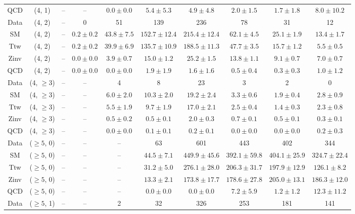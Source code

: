 \begin{table}[h!]
{\begin{tabular}{cccccccccc}
	QCD & (4, 1) & -- & -- & $0.0\pm 0.0$ & $5.4\pm 5.3$ & $4.9\pm 4.8$ & $2.0\pm 1.5$ & $1.7\pm 1.8$ & $8.0\pm 10.2$ \\[0.5ex] 
	Data & (4, 2) & -- & 0 & 51 & 139 & 236 & 78 & 31 & 12 \\[0.5ex] 
	SM & (4, 2) & -- & $0.2\pm 0.2$ & $43.8\pm 7.5$ & $152.7\pm 12.4$ & $215.4\pm 12.4$ & $62.1\pm 4.5$ & $25.1\pm 1.9$ & $13.4\pm 1.7$ \\[0.5ex] 
	Ttw & (4, 2) & -- & $0.2\pm 0.2$ & $39.9\pm 6.9$ & $135.7\pm 10.9$ & $188.5\pm 11.3$ & $47.7\pm 3.5$ & $15.7\pm 1.2$ & $5.5\pm 0.5$ \\[0.5ex] 
	Zinv & (4, 2) & -- & $0.0\pm 0.0$ & $3.9\pm 0.7$ & $15.0\pm 1.2$ & $25.2\pm 1.5$ & $13.8\pm 1.1$ & $9.1\pm 0.7$ & $7.0\pm 0.7$ \\[0.5ex] 
	QCD & (4, 2) & -- & $0.0\pm 0.0$ & $0.0\pm 0.0$ & $1.9\pm 1.9$ & $1.6\pm 1.6$ & $0.5\pm 0.4$ & $0.3\pm 0.3$ & $1.0\pm 1.2$ \\[0.5ex] 
	Data & (4, $\ge3$) & -- & -- & 4 & 8 & 23 & 3 & 2 & 0 \\[0.5ex] 
	SM & (4, $\ge3$) & -- & -- & $6.0\pm 2.0$ & $10.3\pm 2.0$ & $19.2\pm 2.4$ & $3.3\pm 0.6$ & $1.9\pm 0.4$ & $2.8\pm 0.9$ \\[0.5ex] 
	Ttw & (4, $\ge3$) & -- & -- & $5.5\pm 1.9$ & $9.7\pm 1.9$ & $17.0\pm 2.1$ & $2.5\pm 0.4$ & $1.4\pm 0.3$ & $2.3\pm 0.8$ \\[0.5ex] 
	Zinv & (4, $\ge3$) & -- & -- & $0.5\pm 0.2$ & $0.5\pm 0.1$ & $2.0\pm 0.3$ & $0.7\pm 0.1$ & $0.5\pm 0.1$ & $0.3\pm 0.1$ \\[0.5ex] 
	QCD & (4, $\ge3$) & -- & -- & $0.0\pm 0.0$ & $0.1\pm 0.1$ & $0.2\pm 0.1$ & $0.0\pm 0.0$ & $0.0\pm 0.0$ & $0.2\pm 0.3$ \\[0.5ex] 
	Data & ($\ge5$, 0) & -- & -- & -- & 63 & 601 & 443 & 402 & 344 \\[0.5ex] 
	SM & ($\ge5$, 0) & -- & -- & -- & $44.5\pm 7.1$ & $449.9\pm 45.6$ & $392.1\pm 59.8$ & $404.1\pm 25.9$ & $324.7\pm 22.4$ \\[0.5ex] 
	Ttw & ($\ge5$, 0) & -- & -- & -- & $31.2\pm 5.0$ & $276.1\pm 28.0$ & $206.3\pm 31.7$ & $197.9\pm 12.9$ & $126.1\pm 8.2$ \\[0.5ex] 
	Zinv & ($\ge5$, 0) & -- & -- & -- & $13.3\pm 2.1$ & $173.8\pm 17.7$ & $178.6\pm 27.8$ & $205.0\pm 13.1$ & $186.3\pm 12.0$ \\[0.5ex] 
	QCD & ($\ge5$, 0) & -- & -- & -- & $0.0\pm 0.0$ & $0.0\pm 0.0$ & $7.2\pm 5.9$ & $1.2\pm 1.2$ & $12.3\pm 11.2$ \\[0.5ex] 
	Data & ($\ge5$, 1) & -- & -- & 2 & 32 & 326 & 253 & 181 & 141 \\[0.5ex] 

\end{tabular}}
\end{table}
